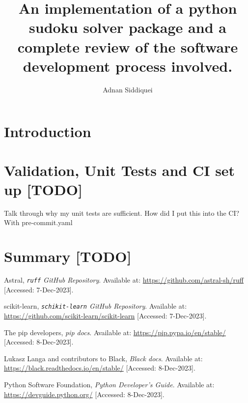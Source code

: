 \documentclass[a4paper,11pt]{article}
\title{\boldmath An implementation of a python sudoku solver package and a complete review of the software development
process involved.}
\author{Adnan Siddiquei}
\affiliation{University of Cambridge}
\newcommand{\inlinecode}[1]{\lstinline{#1}}
\begin{document}
\maketitle
\flushbottom

\section{Introduction}\label{sec:intro}






\section{Validation, Unit Tests and CI set up [TODO]}\label{sec:validation-unit-tests-and-ci-set-up}
Talk through why my unit tests are sufficient.
How did I put this into the CI? With pre-commit.yaml



\section{Summary [TODO]}\label{sec:summary}


\begin{thebibliography}{99}

Astral,
\textit{\inlinecode{ruff} GitHub Repository}.
Available at: \url{https://github.com/astral-sh/ruff}
[Accessed: 7-Dec-2023].

scikit-learn,
\textit{\inlinecode{schikit-learn} GitHub Repository}.
Available at: \url{https://github.com/scikit-learn/scikit-learn}
[Accessed: 7-Dec-2023].

The pip developers,
\textit{pip docs}.
Available at: \url{https://pip.pypa.io/en/stable/}
[Accessed: 8-Dec-2023].

Lukasz Langa and contributors to Black,
\textit{Black docs}.
Available at: \url{https://black.readthedocs.io/en/stable/}
[Accessed: 8-Dec-2023].

Python Software Foundation,
\textit{Python Developer's Guide}.
Available at: \url{https://devguide.python.org/}
[Accessed: 8-Dec-2023].

\end{thebibliography}
\end{document}
